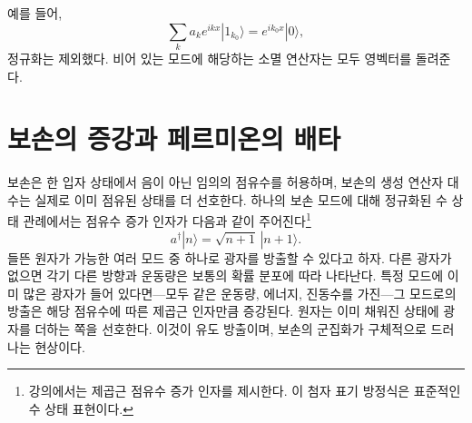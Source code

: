 \begin{classroomqa}
\end{classroomqa}

\begin{classroomqa}
\end{classroomqa}

\begin{classroomqa}
\end{classroomqa}

예를 들어,
\begin{equation}
\sum_k a_k e^{ikx}|1_{k_0}\rangle
=e^{ik_0x}|0\rangle,
\end{equation}
정규화는 제외했다. 비어 있는 모드에 해당하는 소멸 연산자는 모두 영벡터를 돌려준다.

\section{보손의 증강과 페르미온의 배타}

보손은 한 입자 상태에서 음이 아닌 임의의 점유수를 허용하며, 보손의 생성 연산자 대수는 실제로 이미 점유된 상태를 더 선호한다. 하나의 보손 모드에 대해 정규화된 수 상태 관례에서는 점유수 증가 인자가 다음과 같이 주어진다\footnote{강의에서는 제곱근 점유수 증가 인자를 제시한다. 이 첨자 표기 방정식은 표준적인 수 상태 표현이다.}
\begin{equation}
a^\dagger|n\rangle=\sqrt{n+1}\,|n+1\rangle.
\end{equation}
들뜬 원자가 가능한 여러 모드 중 하나로 광자를 방출할 수 있다고 하자. 다른 광자가 없으면 각기 다른 방향과 운동량은 보통의 확률 분포에 따라 나타난다. 특정 모드에 이미 많은 광자가 들어 있다면---모두 같은 운동량, 에너지, 진동수를 가진---그 모드로의 방출은 해당 점유수에 따른 제곱근 인자만큼 증강된다. 원자는 이미 채워진 상태에 광자를 더하는 쪽을 선호한다. 이것이 유도 방출이며, 보손의 군집화가 구체적으로 드러나는 현상이다.

